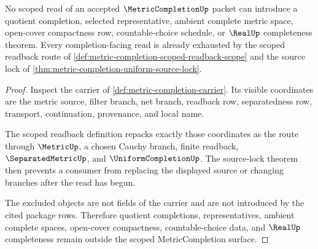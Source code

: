 \begin{theorem}
\label{thm:metric-completion-no-ambient-completion-scope}
No scoped read of an accepted $\MetricCompletionUp$ packet can introduce a quotient completion, selected representative, ambient complete metric space, open-cover compactness row, countable-choice schedule, or $\RealUp$ completeness theorem. Every completion-facing read is already exhausted by the scoped readback route of \autoref{def:metric-completion-scoped-readback-scope} and the source lock of \autoref{thm:metric-completion-uniform-source-lock}.
\end{theorem}
\begin{proof}
Inspect the carrier of \autoref{def:metric-completion-carrier}. Its visible coordinates are the metric source, filter branch, net branch, readback row, separatedness row, transport, continuation, provenance, and local name.

The scoped readback definition repacks exactly those coordinates as the route through $\MetricUp$, a chosen Cauchy branch, finite readback, $\SeparatedMetricUp$, and $\UniformCompletionUp$. The source-lock theorem then prevents a consumer from replacing the displayed source or changing branches after the read has begun.

The excluded objects are not fields of the carrier and are not introduced by the cited package rows. Therefore quotient completions, representatives, ambient complete spaces, open-cover compactness, countable-choice data, and $\RealUp$ completeness remain outside the scoped MetricCompletion surface.
\end{proof}

